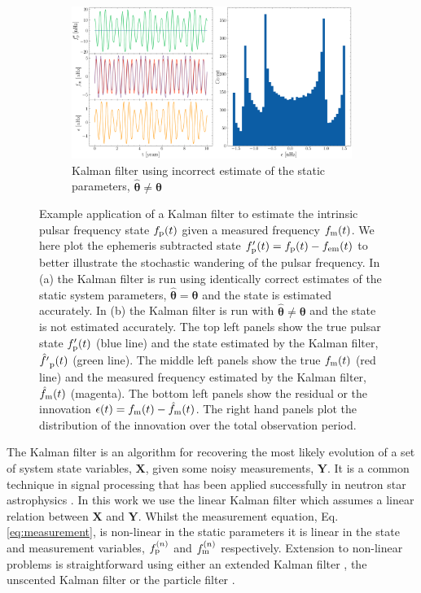 \documentclass[fleqn,usenatbib,useAMS]{mnras}
\begin{document}
\begin{figure}
	\begin{subfigure}[b]{1\textwidth}
		\includegraphics[width=\textwidth]{images/Kalman_example_wrong_params}
		\caption{Kalman filter using incorrect estimate of the static parameters, $\hat{\boldsymbol{\theta}} \neq \boldsymbol{\theta}$}
		\label{fig:25MB_bfs}
	\end{subfigure}
	\caption{Example application of a Kalman filter to estimate the intrinsic pulsar frequency state $f_{\rm p}(t)$ given a measured frequency $f_{\rm m}(t)$. We here plot the ephemeris subtracted state $f'_{\rm p}(t) = f_{\rm p}(t) - f_{\rm em} (t)$ to better illustrate the stochastic wandering of the pulsar frequency. In (a) the Kalman filter is run using identically correct estimates of the static system parameters, $\hat{\boldsymbol{\theta}} = \boldsymbol{\theta}$ and the state is estimated accurately. In (b) the Kalman filter is run with $\hat{\boldsymbol{\theta}} \neq \boldsymbol{\theta}$ and the state is not estimated accurately. The top left panels show the true pulsar state $f'_{\rm p}(t)$ (blue line) and the state estimated by the Kalman filter, $\hat{f'}_{\rm p}(t)$ (green line). The middle left panels show the true $f_{\rm m}(t)$ (red line) and the measured frequency estimated  by the Kalman filter, $\hat{f}_{\rm m}(t)$ (magenta). The bottom left panels show the residual or the innovation $\epsilon(t) =f_{\rm m}(t) - \hat{f}_{\rm m}(t)$. The right hand panels plot the distribution of the innovation over the total observation period.}
	\label{fig:four figures}
\end{figure}

The Kalman filter \citep{Kalman1} is an algorithm for recovering the most likely evolution of a set of system state variables, $\boldsymbol{X}$, given some noisy measurements, $\boldsymbol{Y}$. It is a common technique in signal processing that has been applied successfully in neutron star astrophysics \citep[e.g.][]{Meyers2021,Melatos2023}. In this work we use the linear Kalman filter which assumes a linear relation between $\boldsymbol{X}$ and $\boldsymbol{Y}$. Whilst the measurement equation, Eq. \ref{eq:measurement}, is non-linear in the static parameters it is linear in the state and measurement variables, $f_{\rm p}^{(n)}$ and $f_{\rm m}^{(n)}$ respectively. Extension to non-linear problems is straightforward using either an extended Kalman filter \citep{zarchan2000fundamentals}, the unscented Kalman filter \citep{882463van} or the particle filter \citep{Simon10}. \newline 
\end{document}
